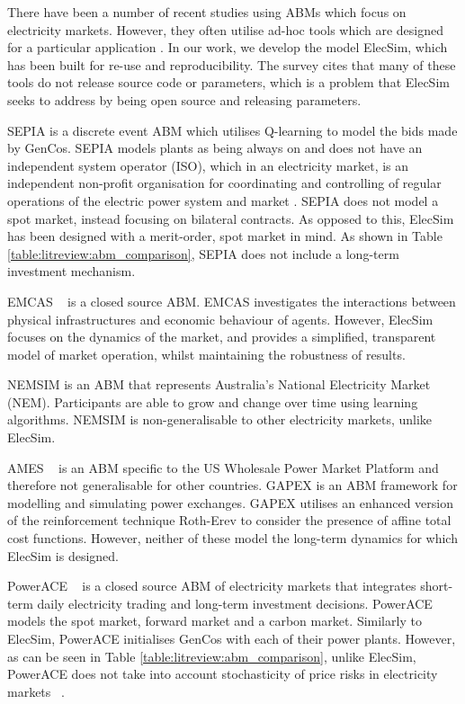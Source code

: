 There have been a number of recent studies using ABMs which focus on electricity markets. However, they often utilise ad-hoc tools which are designed for a particular application \cite{hadar2019, Kunzel2018, Saxena2019}. In our work, we develop the model ElecSim, which has been built for re-use and reproducibility. The survey \cite{Weidlich2008} cites that many of these tools do not release source code or parameters, which is a problem that ElecSim seeks to address by being open source and releasing parameters.


SEPIA \cite{Harp2000} is a discrete event ABM which utilises Q-learning to model the bids made by GenCos. SEPIA models plants as being always on and does not have an independent system operator (ISO), which in an electricity market, is an independent non-profit organisation for coordinating and controlling of regular operations of the electric power system and market \cite{Zhou2007}. SEPIA does not model a spot market, instead focusing on bilateral contracts. As opposed to this, ElecSim has been designed with a merit-order, spot market in mind. As shown in Table \ref{table:litreview:abm_comparison}, SEPIA does not include a long-term investment mechanism. 

EMCAS ~\cite{Conzelmann} is a closed source ABM. EMCAS investigates the interactions between physical infrastructures and economic behaviour of agents. However, ElecSim focuses on the dynamics of the market, and provides a simplified, transparent model of market operation, whilst maintaining the robustness of results.

NEMSIM \cite{Grozev2005} is an ABM that represents Australia's National Electricity Market (NEM). Participants are able to grow and change over time using learning algorithms. NEMSIM is non-generalisable to other electricity markets, unlike ElecSim.

AMES ~\cite{Sun2007} is an ABM specific to the US Wholesale Power Market Platform and therefore not generalisable for other countries. GAPEX \cite{Cincotti2013} is an ABM framework for modelling and simulating power exchanges. GAPEX utilises an enhanced version of the reinforcement technique Roth-Erev \cite{RothAE1995} to consider the presence of affine total cost functions. However, neither of these model the long-term dynamics for which ElecSim is designed.

PowerACE ~\cite{Rothengatter2007} is a closed source ABM of electricity markets that integrates short-term daily electricity trading and long-term investment decisions. PowerACE models the spot market, forward market and a carbon market. Similarly to ElecSim, PowerACE initialises GenCos with each of their power plants. However, as can be seen in Table \ref{table:litreview:abm_comparison}, unlike ElecSim, PowerACE does not take into account stochasticity of price risks in electricity markets ~\cite{Most2010}.

